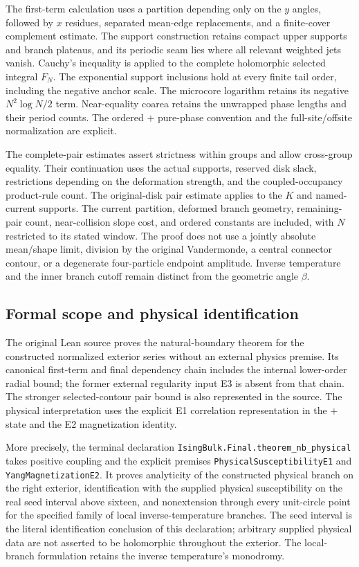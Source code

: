 \documentclass[11pt]{article}
\numberwithin{equation}{section}
\theoremstyle{definition}
\begin{document}
The first-term calculation uses a partition depending only on the
\(y\) angles, followed by \(x\) residues, separated mean-edge replacements,
and a finite-cover complement estimate. The support construction retains
compact upper supports and branch plateaus, and its periodic seam lies
where all relevant weighted jets vanish. Cauchy's inequality is applied
to the complete holomorphic selected integral \(F_N\). The exponential support
inclusions hold at every finite tail order, including the negative
anchor scale. The microcore logarithm retains its negative
\(N^2\log N/2\) term. Near-equality coarea retains the
unwrapped phase lengths and their period counts. The ordered \(+\) pure-phase
convention and the full-site/offsite normalization are explicit.

The complete-pair estimates assert strictness within groups and allow
cross-group equality. Their continuation uses the actual supports,
reserved disk slack, restrictions depending on the deformation strength,
and the coupled-occupancy product-rule count. The original-disk pair
estimate applies to the \(K\) and named-current supports. The current
partition, deformed branch geometry, remaining-pair count, near-collision
slope cost, and ordered constants are included, with \(N\) restricted to its stated
window. The proof does not use
a jointly absolute mean/shape limit, division by the original
Vandermonde, a central connector contour, or a degenerate four-particle
endpoint amplitude. Inverse temperature and the inner branch cutoff
remain distinct from the geometric angle \(\beta\).

\subsection{Formal scope and physical identification}
The original Lean source proves the natural-boundary theorem for the
constructed normalized exterior series without an external physics
premise. Its canonical first-term and final dependency chain includes
the internal lower-order radial bound; the former external regularity
input E3 is absent from that chain. The stronger selected-contour pair
bound is also represented in the source. The physical interpretation
uses the explicit E1 correlation representation in the \(+\) state and
the E2 magnetization identity.

More precisely, the terminal declaration
\texttt{IsingBulk.Final.theorem\_nb\_physical} takes positive coupling
and the explicit premises \texttt{PhysicalSusceptibilityE1} and
\texttt{YangMagnetizationE2}. It proves analyticity of the constructed
physical branch on the right exterior, identification with the supplied
physical susceptibility on the real seed interval above sixteen, and
nonextension through every unit-circle point for the specified family
of local inverse-temperature branches. The seed interval is the literal
identification conclusion of this declaration; arbitrary supplied
physical data are not asserted to be holomorphic throughout the
exterior. The local-branch formulation retains the inverse temperature's
monodromy.
\end{document}
